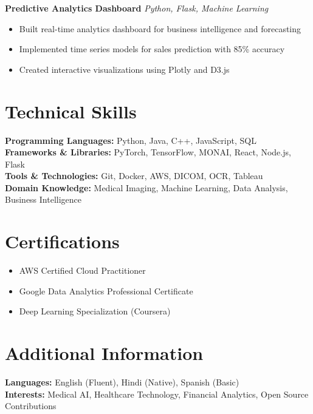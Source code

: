 \documentclass[11pt,a4paper]{article}
\begin{document}
\textbf{Predictive Analytics Dashboard} \hfill \textit{Python, Flask, Machine Learning}
\begin{itemize}
    \item Built real-time analytics dashboard for business intelligence and forecasting
    \item Implemented time series models for sales prediction with 85\% accuracy
    \item Created interactive visualizations using Plotly and D3.js
\end{itemize}

\vspace{10pt}

\section{Technical Skills}

\textbf{Programming Languages:} Python, Java, C++, JavaScript, SQL \\
\textbf{Frameworks \& Libraries:} PyTorch, TensorFlow, MONAI, React, Node.js, Flask \\
\textbf{Tools \& Technologies:} Git, Docker, AWS, DICOM, OCR, Tableau \\
\textbf{Domain Knowledge:} Medical Imaging, Machine Learning, Data Analysis, Business Intelligence

\vspace{10pt}

\section{Certifications}

\begin{itemize}
    \item AWS Certified Cloud Practitioner
    \item Google Data Analytics Professional Certificate
    \item Deep Learning Specialization (Coursera)
\end{itemize}

\vspace{10pt}

\section{Additional Information}

\textbf{Languages:} English (Fluent), Hindi (Native), Spanish (Basic) \\
\textbf{Interests:} Medical AI, Healthcare Technology, Financial Analytics, Open Source Contributions
\end{document}
